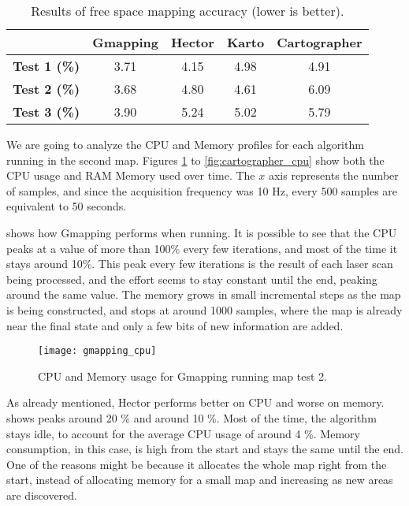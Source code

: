 \begin{table}[!ht]
\centering
\renewcommand*{\arraystretch}{1.1}
\begin{tabular}{c|c|c|c|c}
& \textbf{Gmapping} & \textbf{Hector} & \textbf{Karto} & \textbf{Cartographer} \\ \hline
\textbf{Test 1 (\%)} & 3.71 & 4.15 & 4.98 & 4.91 \\
\textbf{Test 2 (\%)} & 3.68 & 4.80 & 4.61 & 6.09 \\
\textbf{Test 3 (\%)} & 3.90 & 5.24 & 5.02 & 5.79 \\
 \hline
\end{tabular}
\caption{Results of free space mapping accuracy (lower is better).}
\label{tab:results_whitespace}
\end{table}

We are going to analyze the CPU and Memory profiles for each algorithm running in the second map. Figures \ref{fig:gmapping_cpu} to \ref{fig:cartographer_cpu} show both the CPU usage and RAM Memory used over time. The $x$ axis represents the number of samples, and since the acquisition frequency was 10 Hz, every 500 samples are equivalent to 50 seconds.

 shows how Gmapping performs when running. It is possible to see that the CPU peaks at a value of more than 100\% every few iterations, and most of the time it stays around 10\%. This peak every few iterations is the result of each laser scan being processed, and the effort seems to stay constant until the end, peaking around the same value. The memory grows in small incremental steps as the map is being constructed, and stops at around 1000 samples, where the map is already near the final state and only a few bits of new information are added.

\begin{figure}[!ht]
    \centering
    \texttt{[image: gmapping\_cpu]}
    \caption{CPU and Memory usage for Gmapping running map test 2.}
    \label{fig:gmapping_cpu}
\end{figure}

As already mentioned, Hector performs better on CPU and worse on memory.  shows peaks around 20 \% and around 10 \%. Most of the time, the algorithm stays idle, to account for the average CPU usage of around 4 \%. Memory consumption, in this case, is high from the start and stays the same until the end. One of the reasons might be because it allocates the whole map right from the start, instead of allocating memory for a small map and increasing as new areas are discovered.

